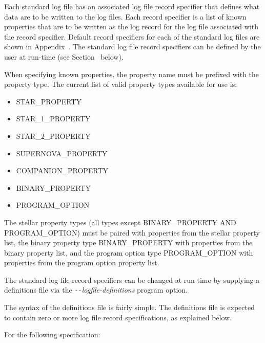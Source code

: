 Each standard log file has an associated log file record specifier that defines what data are to be written to the log files. Each record specifier is a list of known properties that are to be written as the log record for the log file associated with the record specifier. Default record specifiers for each of the standard log files are shown in Appendix~. The standard log file record specifiers can be defined by the user at run-time (see Section~ below).

When specifying known properties, the property name must be prefixed with the property type. The current list of valid property types available for use is:

\setlength{\parskip}{2pt}
\begin{itemize}
\itemsep0pt
\item  STAR\_PROPERTY
\item  STAR\_1\_PROPERTY
\item  STAR\_2\_PROPERTY
\item  SUPERNOVA\_PROPERTY
\item  COMPANION\_PROPERTY
\item  BINARY\_PROPERTY
\item  PROGRAM\_OPTION
\end{itemize}
\setlength{\parskip}{6pt}

The stellar property types (all types except BINARY\_PROPERTY AND PROGRAM\_OPTION) must be paired with properties from the stellar property list, the binary property type BINARY\_PROPERTY with properties from the binary property list, and the program option type PROGRAM\_OPTION with properties from the program option property list.

\newpage
{}\label{sec:StandardLogFileRecordSpecification}

The standard log file record specifiers can be changed at run-time by supplying a definitions file via the \textit{\texttt{-{}-}logfile-definitions} program option.

The syntax of the definitions file is fairly simple. The definitions file is expected to contain zero or more log file record specifications, as explained below.

\bigskip
For the following specification:

\setlength{\parskip}{3pt}
\tabto{3em}{::=}


